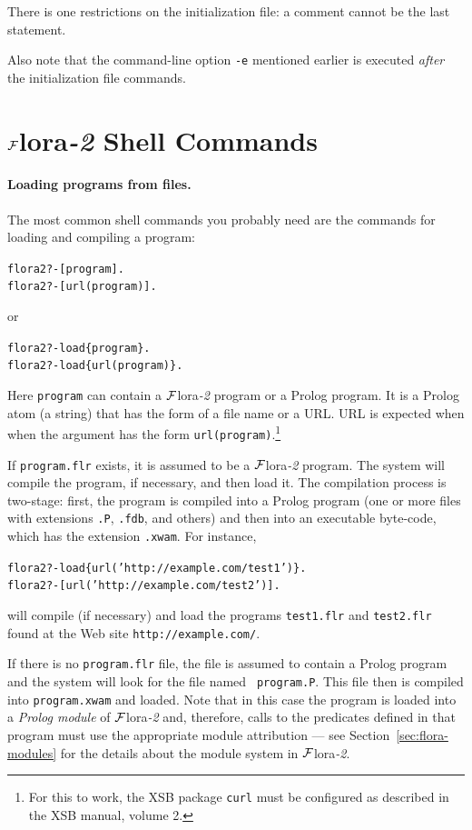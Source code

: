 \documentclass[11pt]{article}
\newcommand{\FLSYSTEM}{{\mbox{\sc ${\cal F}${lora}\rm\emph{-2}}}\xspace}
\newcommand{\prompt}{flora2 ?- }
\newcommand{\flrext}{flr}
\newcommand{\ofile}{xwam}
\begin{document}
There is one restrictions on the initialization file: a comment cannot be the
last statement.

Also note that the command-line option \texttt{-e} mentioned earlier is
executed \emph{after} the initialization file commands. 


\section{\FLSYSTEM Shell Commands} \label{sec-shell-commands}

\paragraph{Loading programs from files.}
The most common shell commands you probably need are the commands for
loading and compiling a program:
\begin{alltt}
  \prompt  [program].
  \prompt  [url(program)].
\end{alltt}
or 
\begin{alltt}
  \prompt load\{program\}.
  \prompt load\{url(program)\}.
\end{alltt}
Here {\tt program} can contain a \FLSYSTEM program or a Prolog program.
It is a Prolog  atom (a string) that has the form of a file name or a
URL. URL is expected when
when the argument has the form {\tt url(program)}.\footnote{
  For this to work, the XSB package {\tt curl} must be configured as
  described in the XSB manual, volume 2. 
  }

If {\tt program.\flrext} exists, it is assumed to be a \FLSYSTEM program. The
system will compile the program, if necessary, and then load it. The
compilation process is two-stage: first, the program is compiled into a
Prolog program (one or more files with extensions {\tt .P}, {\tt .fdb}, and
others)
and then into an executable byte-code, which has the extension {\tt .\ofile}.
For instance, 
\begin{alltt}
  \prompt load\{url('http://example.com/test1')\}.
  \prompt [url('http://example.com/test2')].
\end{alltt}
will compile (if necessary) and load the programs {\tt test1.\flrext} and
{\tt test2.\flrext} found at the Web site {\tt http://example.com/}.   

If there is no {\tt program.\flrext} file, the file is assumed to contain
a Prolog program and the system will look for the file named {\tt
  program.P}. This file then is compiled into {\tt program.\ofile} and
loaded. Note that in this case the program is loaded into a {\em Prolog
  module} of \FLSYSTEM and, therefore, calls to the predicates defined in that
program must use the appropriate module attribution --- see
Section~\ref{sec:flora-modules} for the details about the module system in
\FLSYSTEM.
\end{document}
